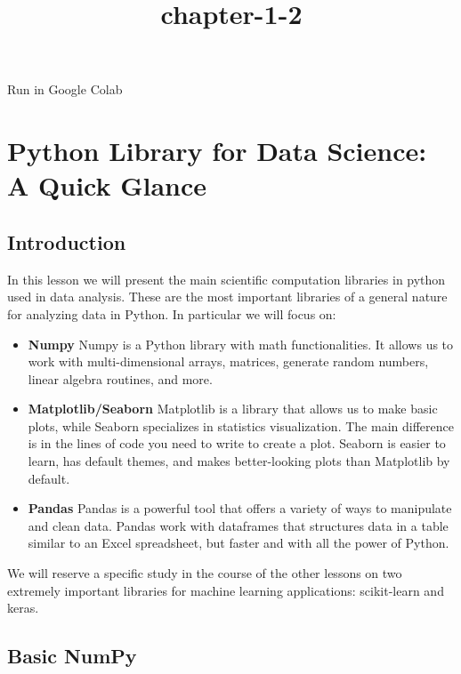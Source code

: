 \documentclass[11pt]{article}
\title{chapter-1-2}
\begin{document}
    
    \maketitle
    
    

    
    Run in Google Colab

    \hypertarget{python-library-for-data-science-a-quick-glance}{%
\section{Python Library for Data Science: A Quick
Glance}\label{python-library-for-data-science-a-quick-glance}}

    \hypertarget{introduction}{%
\subsection{Introduction}\label{introduction}}

In this lesson we will present the main scientific computation libraries
in python used in data analysis. These are the most important libraries
of a general nature for analyzing data in Python. In particular we will
focus on:

\begin{itemize}
\item
  \textbf{Numpy} Numpy is a Python library with math functionalities. It
  allows us to work with multi-dimensional arrays, matrices, generate
  random numbers, linear algebra routines, and more.
\item
  \textbf{Matplotlib/Seaborn} Matplotlib is a library that allows us to
  make basic plots, while Seaborn specializes in statistics
  visualization. The main difference is in the lines of code you need to
  write to create a plot. Seaborn is easier to learn, has default
  themes, and makes better-looking plots than Matplotlib by default.
\item
  \textbf{Pandas} Pandas is a powerful tool that offers a variety of
  ways to manipulate and clean data. Pandas work with dataframes that
  structures data in a table similar to an Excel spreadsheet, but faster
  and with all the power of Python.
\end{itemize}

We will reserve a specific study in the course of the other lessons on
two extremely important libraries for machine learning applications:
scikit-learn and keras.

    \hypertarget{basic-numpy}{%
\subsection{Basic NumPy}\label{basic-numpy}}
\end{document}
